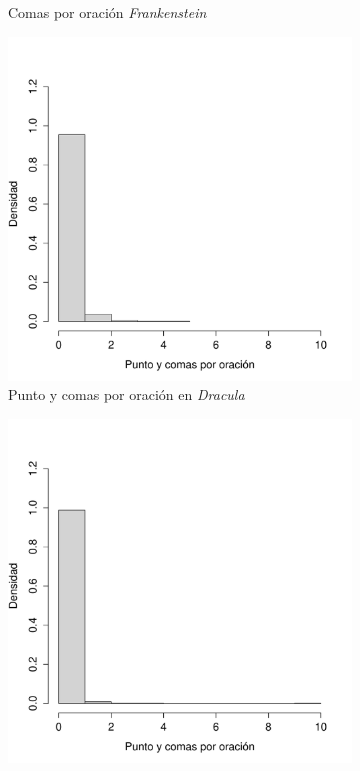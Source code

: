 \documentclass[paper=leter, fontsize=11pt]{scrartcl}
\numberwithin{equation}{section}		%
\numberwithin{figure}{section}			%
\numberwithin{table}{section}				%
\begin{document}
\begin{figure}
\begin{subfigure}{0.5\textwidth}
        \caption{Comas por oración \textit{Frankenstein}}
        \label{fra_comas}
    \end{subfigure}
    \begin{subfigure}{.5\textwidth}
        \centering
        \includegraphics[scale=0.4]{dra_pcomas.pdf}
        \caption{Punto y comas por oración en \textit{Dracula}}
        \label{dra_pcomas}
    \end{subfigure}
    \begin{subfigure}{0.5\textwidth}
        \centering
        \includegraphics[scale=0.4]{fra_pcomas.pdf}

\end{subfigure}
\end{figure}
\end{document}
